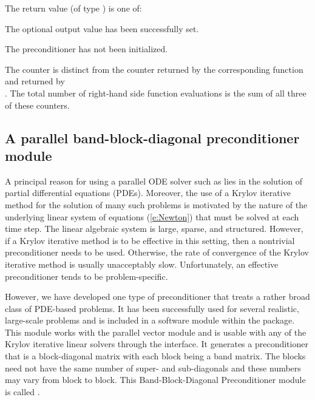 {
  The return value  (of type ) is one of:
  \begin{args}
  \item[\Id{CVLS\_SUCCESS}]
    The optional output value has been successfully set.
  \item[\Id{CVLS\_PMEM\_NULL}]
    The {\cvbandpre} preconditioner has not been initialized.
  \end{args}
}
{
The counter  is distinct from the counter 
returned by the corresponding function  and
 returned by\\ \noindent {}.
The total number of right-hand side function evaluations is the
sum of all three of these counters.
}

\subsection{A parallel band-block-diagonal preconditioner module}
\label{sss:cvbbdpre}

A principal reason for using a parallel ODE solver such as {\cvode} lies
in the solution of partial differential equations (PDEs).  Moreover,
the use of a Krylov iterative method for the solution of many such
problems is motivated by the nature of the underlying linear system of
equations (\ref{e:Newton}) that must be solved at each time step.  The
linear algebraic system is large, sparse, and structured. However, if
a Krylov iterative method is to be effective in this setting, then a
nontrivial preconditioner needs to be used.  Otherwise, the rate of
convergence of the Krylov iterative method is usually unacceptably
slow.  Unfortunately, an effective preconditioner tends to be
problem-specific.

However, we have developed one type of preconditioner that treats a
rather broad class of PDE-based problems.  It has been successfully
used for several realistic, large-scale problems \cite{HiTa:98} and is
included in a software module within the {\cvode} package. This module
works with the parallel vector module {\nvecp} and is usable with any of
the Krylov iterative linear solvers through the {\cvls} interface.
It generates a preconditioner that is a block-diagonal matrix with
each block being a band matrix. The blocks need not have the same
number of super- and sub-diagonals and these numbers may vary from
block to block. This Band-Block-Diagonal Preconditioner module is
called {\cvbbdpre}.

